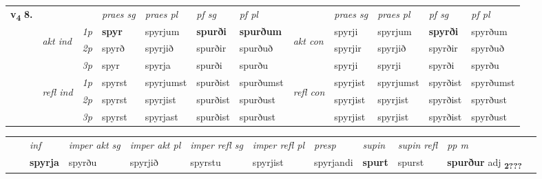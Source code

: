 \begin{tabular}{llllllllllll} \toprule
\multirow{4}{*}{{{\textbf{v{\textsubscript{4}}} \Large{\textbf{8.}}}}}  & &   &  \textit{praes sg}  & \textit{praes pl}  &\textit{ pf sg} & \textit{pf pl} &  &  \textit{praes sg}  & \textit{praes pl}  & \textit{pf sg} & \textit{pf pl } \\*
	\cmidrule{4-7} \cmidrule{9-12}
 & \multirow{3}{*}{\begin{turn}{90}\textit{akt ind}\end{turn}} & {\textit{1p}} & \textbf{spyr} & spyrjum    & \textbf{spurði} & \textbf{spurðum} & \multirow{3}{*}{\begin{turn}{90}\textit{akt con}\end{turn}} &spyrji & spyrjum & \textbf{spyrði} & spyrðum\\*
& &  {\textit{2p}} &  spyrð  & spyrjið   & spurðir & spurðuð & & spyrjir & spyrjið & spyrðir & spyrðuð \\*
& &  {\textit{3p}} & spyr & spyrja   & spurði & spurðu & & spyrji & spyrji& spyrði & spyrðu  \\*
\cmidrule{4-7} \cmidrule{9-12}
 &\multirow{3}{*}{\begin{turn}{90}\textit{refl ind}\end{turn}} & {\textit{1p}} & spyrst & spyrjumst    & spurðist & spurðumst & \multirow{3}{*}{\begin{turn}{90}\textit{refl con}\end{turn}}  &spyrjist & spyrjumst & spyrðist & spyrðumst\\*
 &&  {\textit{2p}} &  spyrst  & spyrjist   & spurðist & spurðust & &spyrjist & spyrjist & spyrðist & spyrðust \\*
& &  {\textit{3p}} & spyrst & spyrjast   & spurðist & spurðust & & spyrjist & spyrjist& spyrðist & spyrðust  \\*
\cmidrule{4-7} \cmidrule{9-12}
\end{tabular}


\begin{tabular}{llllllllllll}
 & & \textit{inf} & \textit{imper akt sg} & \textit{imper akt pl} & \textit{imper refl sg} & \textit{imper refl pl} & \textit{presp} & \textit{supin} & \textit{supin refl} & \textit{pp m}     \\*
  & & \textbf{spyrja} & spyrðu  & spyrjið & spyrstu & spyrjist & spyrjandi &  \textbf{spurt} & spurst & \textbf{spurður} adj \textbf{\textsubscript{2???}} \\*
\cmidrule{1-12}
\end{tabular}



